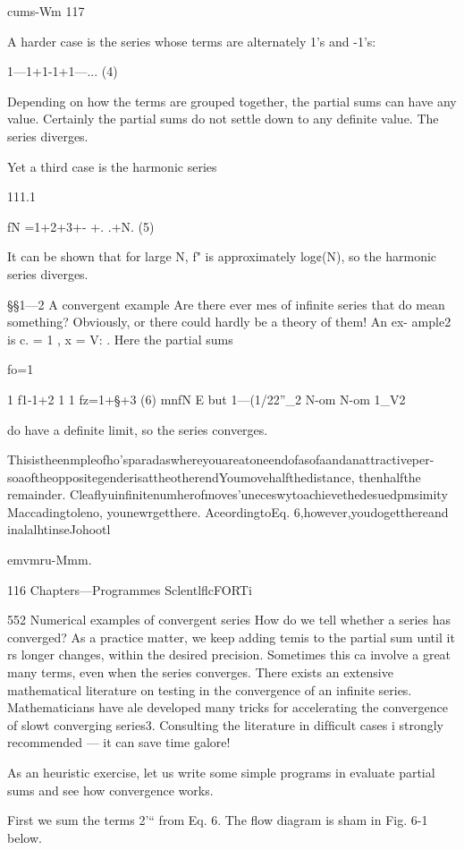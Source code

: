 cums-Wm 117

A harder case is the series whose terms are alternately 1's and
-1's:

1—1+1-1+1—... (4)

Depending on how the terms are grouped together, the partial
sums can have any value. Certainly the partial sums do not settle
down to any deﬁnite value. The series diverges.

Yet a third case is the harmonic series

111.1

fN =1+2+3+- +. .+N. (5)

It can be shown that for large N, f" is approximately log¢(N), so
the harmonic series diverges.

§§1—2 A convergent example
Are there ever mes of inﬁnite series that do mean something?
Obviously, or there could hardly be a theory of them! An ex-
ample2 is c. = 1 , x = V: . Here the partial sums

fo=1

1
f1-1+2
1 1
fz=1+§+3 (6)
mnfN E but 1—(1/22”_2
N-om N-om 1_V2

do have a deﬁnite limit, so the series converges.

 

Thisistheenmpleofho'sparadaswhereyouareatoneendofasofaandanattractiveper-
soaoftheoppositegenderisattheotherendYoumovehalfthedistance, thenhalfthe
remainder. Cleaﬂyuinﬁnitenumherofmoves'uneceswytoachievethedesuedpmsimity
Maccadingtoleno, younewrgetthere. AceordingtoEq. 6,however,youdogetthereand
inalalhtinseJohootl

emvmru-Mmm.

116 Chapters—Programmes SclentlﬂcFORTi

552 Numerical examples of convergent series
How do we tell whether a series has converged? As a practice
matter, we keep adding temis to the partial sum until it rs
longer changes, within the desired precision. Sometimes this ca
involve a great many terms, even when the series converges.
There exists an extensive mathematical literature on testing in
the convergence of an inﬁnite series. Mathematicians have ale
developed many tricks for accelerating the convergence of slowt
converging series3. Consulting the literature in difﬁcult cases i
strongly recommended — it can save time galore!

As an heuristic exercise, let us write some simple programs in
evaluate partial sums and see how convergence works.

First we sum the terms 2'“ from Eq. 6. The ﬂow diagram is sham
in Fig. 6-1 below.

